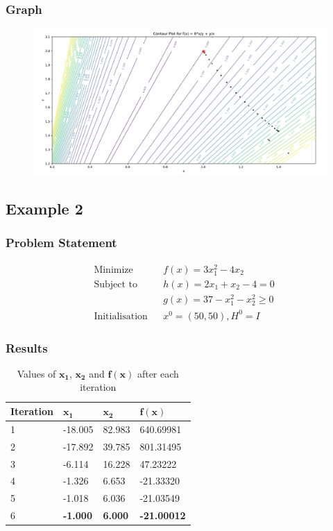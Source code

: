 \documentclass{article}
\begin{document}
\subsubsection*{Graph}

\begin{figure}[H]
\centering
    \includegraphics[width=450px]{graph1.pdf}
\label{fig:acc1}
\end{figure}

\subsection*{Example 2}

\subsubsection*{Problem Statement}

\begin{equation*}
    \begin{aligned}
        & \text{Minimize}
        & & f(x) = 3x_1^{2} - 4x_2 \\
        & \text{Subject to}
        & & h(x) = 2x_1 + x_2 - 4 = 0\\
        &&& g(x) = 37 - x_1^2 - x_2^2 \geq 0\\
        & \text{Initialisation}
        & & x^0 = (50,50) , H^0 = I
    \end{aligned}
\end{equation*}
\subsubsection*{Results}
\begin{table}[H]
\centering
\caption{Values of $\mathbf{x_1}$, $\mathbf{x_2}$ and $\mathbf{f(x)}$ after each iteration}
\label{my-label1}
\begin{tabular}{|l|l|l|l|}\hline
\textbf{Iteration} & $\mathbf{x_1}$ & $\mathbf{x_2}$ & $\mathbf{f(x)}$ \\ \hline

1 &  -18.005 & 82.983 & 640.69981 \\ \hline
2 &  -17.892 & 39.785 & 801.31495 \\ \hline
3 &   -6.114 & 16.228 &  47.23222 \\ \hline
4 &   -1.326 &  6.653 & -21.33320 \\ \hline
5 &   -1.018 &  6.036 & -21.03549 \\ \hline
6 & \textbf{-1.000} & \textbf{6.000} & \textbf{-21.00012} \\ \hline
\end{tabular}
\end{table}
\end{document}
